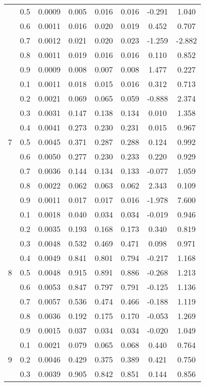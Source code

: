 \documentclass[11pt,a4paper]{report}
\begin{document}
\begin{longtable}{ | c | c || c | c | c | c | c | c | }
 & 0.5 & 0.0009 & 0.005 & 0.016 & 0.016 & -0.291 & 1.040 \\
 & 0.6 & 0.0011 & 0.016 & 0.020 & 0.019 & 0.452 & 0.707 \\
 & 0.7 & 0.0012 & 0.021 & 0.020 & 0.023 & -1.259 & -2.882 \\
 & 0.8 & 0.0011 & 0.019 & 0.016 & 0.016 & 0.110 & 0.852 \\
 & 0.9 & 0.0009 & 0.008 & 0.007 & 0.008 & 1.477 & 0.227 \\
 \hline
\multirow{9}{*}{7} & 0.1 & 0.0011 & 0.018 & 0.015 & 0.016 & 0.312 & 0.713 \\
 & 0.2 & 0.0021 & 0.069 & 0.065 & 0.059 & -0.888 & 2.374 \\
 & 0.3 & 0.0031 & 0.147 & 0.138 & 0.134 & 0.010 & 1.358 \\
 & 0.4 & 0.0041 & 0.273 & 0.230 & 0.231 & 0.015 & 0.967 \\
 & 0.5 & 0.0045 & 0.371 & 0.287 & 0.288 & 0.124 & 0.992 \\
 & 0.6 & 0.0050 & 0.277 & 0.230 & 0.233 & 0.220 & 0.929 \\
 & 0.7 & 0.0036 & 0.144 & 0.134 & 0.133 & -0.077 & 1.059 \\
 & 0.8 & 0.0022 & 0.062 & 0.063 & 0.062 & 2.343 & 0.109 \\
 & 0.9 & 0.0011 & 0.017 & 0.017 & 0.016 & -1.978 & 7.600 \\
 \hline
\multirow{9}{*}{8} & 0.1 & 0.0018 & 0.040 & 0.034 & 0.034 & -0.019 & 0.946 \\
 & 0.2 & 0.0035 & 0.193 & 0.168 & 0.173 & 0.340 & 0.819 \\
 & 0.3 & 0.0048 & 0.532 & 0.469 & 0.471 & 0.098 & 0.971 \\
 & 0.4 & 0.0049 & 0.841 & 0.801 & 0.794 & -0.217 & 1.168 \\
 & 0.5 & 0.0048 & 0.915 & 0.891 & 0.886 & -0.268 & 1.213 \\
 & 0.6 & 0.0053 & 0.847 & 0.797 & 0.791 & -0.125 & 1.136 \\
 & 0.7 & 0.0057 & 0.536 & 0.474 & 0.466 & -0.188 & 1.119 \\
 & 0.8 & 0.0036 & 0.192 & 0.175 & 0.170 & -0.053 & 1.269 \\
 & 0.9 & 0.0015 & 0.037 & 0.034 & 0.034 & -0.020 & 1.049 \\
 \hline
\multirow{9}{*}{9} & 0.1 & 0.0021 & 0.079 & 0.065 & 0.068 & 0.440 & 0.764 \\
 & 0.2 & 0.0046 & 0.429 & 0.375 & 0.389 & 0.421 & 0.750 \\
 & 0.3 & 0.0039 & 0.905 & 0.842 & 0.851 & 0.144 & 0.856 \\

\end{longtable}
\end{document}
